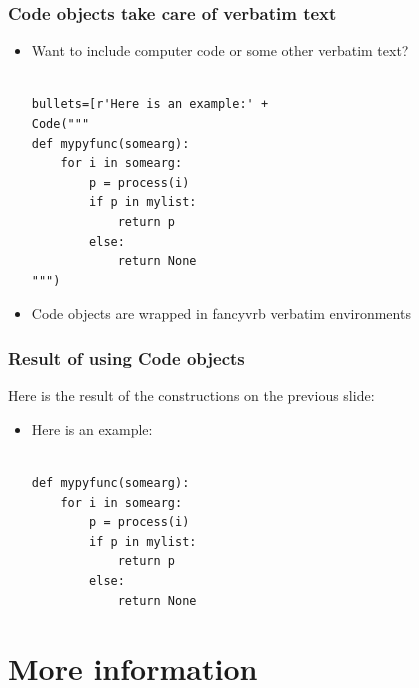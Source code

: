 \documentclass{beamer}
\begin{document}
\begin{frame}[fragile]
\frametitle{Code objects take care of verbatim text}

\begin{block}

\begin{itemize}
\item Want to include computer code or some other verbatim text?\\ \begin{Verbatim}[fontsize=\footnotesize,tabsize=4,baselinestretch=0.85,fontfamily=tt,xleftmargin=7mm]

bullets=[r'Here is an example:' +
Code("""
def mypyfunc(somearg):
    for i in somearg:
        p = process(i)
        if p in mylist:
            return p
        else:
            return None
""")
\end{Verbatim}

\item Code objects are wrapped in fancyvrb verbatim environments
\end{itemize}

\end{block}

\end{frame}

\begin{frame}[fragile]
\frametitle{Result of using Code objects}

\begin{block}{Here is the result of the constructions on the previous slide:}

\begin{itemize}
\item Here is an example:\begin{Verbatim}[fontsize=\footnotesize,tabsize=4,baselinestretch=0.85,fontfamily=tt,xleftmargin=7mm]

def mypyfunc(somearg):
    for i in somearg:
        p = process(i)
        if p in mylist:
            return p
        else:
            return None
\end{Verbatim}

\end{itemize}

\end{block}

\end{frame}

\section[More]{More information}
\end{document}
